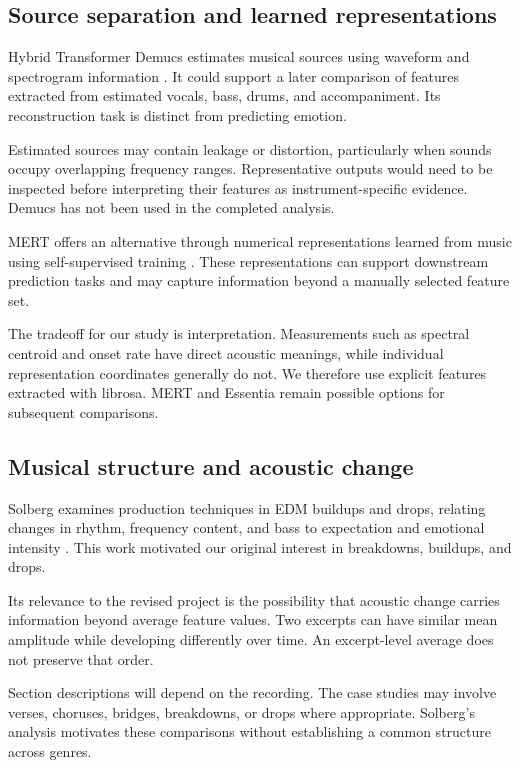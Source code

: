 \subsection{Source separation and learned representations}

Hybrid Transformer Demucs estimates musical sources using waveform and spectrogram information \cite{rouard2023demucs}. It could support a later comparison of features extracted from estimated vocals, bass, drums, and accompaniment. Its reconstruction task is distinct from predicting emotion.

Estimated sources may contain leakage or distortion, particularly when sounds occupy overlapping frequency ranges. Representative outputs would need to be inspected before interpreting their features as instrument-specific evidence. Demucs has not been used in the completed analysis.

MERT offers an alternative through numerical representations learned from music using self-supervised training \cite{li2024mert}. These representations can support downstream prediction tasks and may capture information beyond a manually selected feature set.

The tradeoff for our study is interpretation. Measurements such as spectral centroid and onset rate have direct acoustic meanings, while individual representation coordinates generally do not. We therefore use explicit features extracted with librosa. MERT and Essentia remain possible options for subsequent comparisons.

\subsection{Musical structure and acoustic change}

Solberg examines production techniques in EDM buildups and drops, relating changes in rhythm, frequency content, and bass to expectation and emotional intensity \cite{solberg2014bass}. This work motivated our original interest in breakdowns, buildups, and drops.

Its relevance to the revised project is the possibility that acoustic change carries information beyond average feature values. Two excerpts can have similar mean amplitude while developing differently over time. An excerpt-level average does not preserve that order.

Section descriptions will depend on the recording. The case studies may involve verses, choruses, bridges, breakdowns, or drops where appropriate. Solberg's analysis motivates these comparisons without establishing a common structure across genres.

